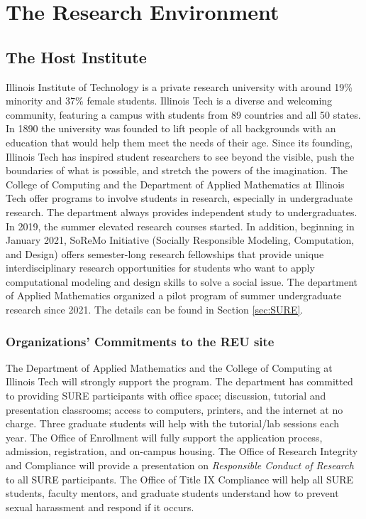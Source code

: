 \documentclass[11pt]{NSFamsart}
\begin{document}








%


\section{The Research Environment}


 
\subsection{The Host Institute}

Illinois Institute of Technology is a private research university with around 19\% minority and 37\% female students. Illinois Tech is a diverse and welcoming community, featuring a campus with students from 89 countries and all 50 states. In 1890 the university was founded to lift people of all backgrounds with an education that would help them meet the needs of their age. Since its founding, Illinois Tech has inspired student researchers to see beyond the visible, push the boundaries of what is possible, and stretch the powers of the imagination. The College of Computing
and the Department of Applied Mathematics at Illinois Tech offer programs to involve students
in research, especially in undergraduate research. The department always provides independent study to undergraduates. In 2019, the summer elevated research courses started. In addition, beginning in January 2021, SoReMo Initiative (Socially Responsible Modeling, Computation, and Design) offers semester-long research fellowships that provide unique interdisciplinary research opportunities for students who want to apply computational modeling and design skills to solve a social issue. The department of Applied Mathematics organized a pilot program of summer undergraduate research since 2021. The details can be found in Section \ref{sec:SURE}.


\subsubsection{Organizations' Commitments to the REU site}
The Department of Applied Mathematics and the College of Computing at Illinois Tech will strongly support the program. The department has committed to providing SURE participants with office space; discussion, tutorial and presentation classrooms;  access to computers, printers, and the internet at no charge. Three graduate students will help with the tutorial/lab sessions each year.
The Office of Enrollment will fully support the application process, admission, registration, and on-campus housing. 
The Office of Research Integrity and Compliance will provide a presentation on \emph{Responsible Conduct of Research} to all SURE  participants. The Office of Title IX Compliance will help all SURE students, faculty mentors, and graduate students understand how to prevent sexual harassment and respond if it occurs.
\end{document}
